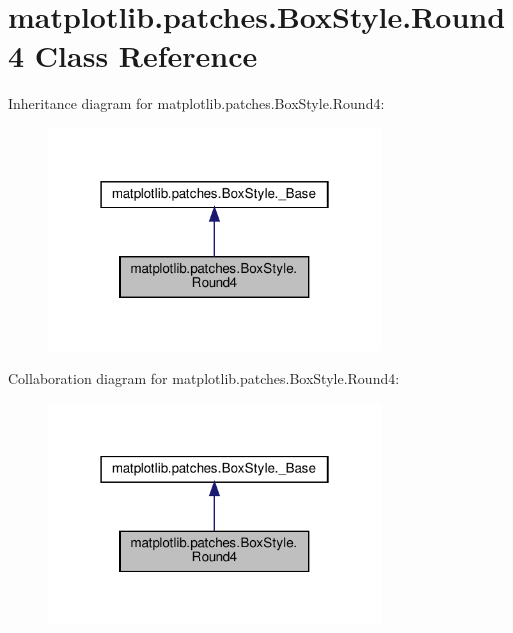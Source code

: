 \hypertarget{classmatplotlib_1_1patches_1_1BoxStyle_1_1Round4}{}\section{matplotlib.\+patches.\+Box\+Style.\+Round4 Class Reference}
\label{classmatplotlib_1_1patches_1_1BoxStyle_1_1Round4}


Inheritance diagram for matplotlib.\+patches.\+Box\+Style.\+Round4\+:
\nopagebreak
\begin{figure}[H]
\begin{center}
\leavevmode
\includegraphics[width=250pt]{classmatplotlib_1_1patches_1_1BoxStyle_1_1Round4__inherit__graph}
\end{center}
\end{figure}


Collaboration diagram for matplotlib.\+patches.\+Box\+Style.\+Round4\+:
\nopagebreak
\begin{figure}[H]
\begin{center}
\leavevmode
\includegraphics[width=250pt]{classmatplotlib_1_1patches_1_1BoxStyle_1_1Round4__coll__graph}
\end{center}
\end{figure}
